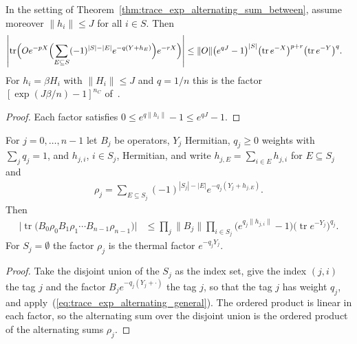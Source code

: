 \begin{theorem}
    \label{thm:trace_exp_alternating_sum_between_pow}
    \leanok
    In the setting of Theorem~\ref{thm:trace_exp_alternating_sum_between},
    assume moreover $\|h_i\|\le J$ for all $i\in S$. Then
    \begin{align}
        \left|\operatorname{tr}\Bigl(Oe^{-pX}\Bigl(\sum_{E\subseteq S}(-1)^{|S|-|E|}
        e^{-q(Y+h_E)}\Bigr)e^{-rX}\Bigr)\right|
         & \le \|O\|\bigl(e^{qJ}-1\bigr)^{|S|}
        \bigl(\operatorname{tr}e^{-X}\bigr)^{p+r}
        \bigl(\operatorname{tr}e^{-Y}\bigr)^{q}.
    \end{align}
    For $h_i=\beta H_i$ with $\|H_i\|\le J$ and $q=1/n$ this is the factor
    $[\exp(J\beta/n)-1]^{n_C}$ of~\cite{Hastings2006Solving}.
\end{theorem}
\begin{proof}\leanok
    Each factor satisfies $0\le e^{q\|h_i\|}-1\le e^{qJ}-1$.
\end{proof}

\begin{theorem}
    \label{thm:trace_exp_alternating_sum_product}
    \leanok
    For $j=0,\dots,n-1$ let $B_j$ be operators, $Y_j$ Hermitian, $q_j\ge0$
    weights with $\sum_jq_j=1$, and $h_{j,i}$, $i\in S_j$, Hermitian, and
    write $h_{j,E}=\sum_{i\in E}h_{j,i}$ for $E\subseteq S_j$ and
    \begin{align*}
        \rho_j=\sum_{E\subseteq S_j}(-1)^{|S_j|-|E|}e^{-q_j(Y_j+h_{j,E})}.
    \end{align*}
    Then
    \begin{align}
        \bigl|\operatorname{tr}\bigl(B_0\rho_0B_1\rho_1\cdots B_{n-1}\rho_{n-1}\bigr)\bigr|
         & \le\prod_j\|B_j\|\prod_{i\in S_j}\bigl(e^{q_j\|h_{j,i}\|}-1\bigr)
        \bigl(\operatorname{tr}e^{-Y_j}\bigr)^{q_j}.
        \label{eq:trace_exp_alternating_sum_product}
    \end{align}
    For $S_j=\emptyset$ the factor $\rho_j$ is the thermal factor
    $e^{-q_jY_j}$.
\end{theorem}
\begin{proof}\leanok
    Take the disjoint union of the $S_j$ as the index set, give the index
    $(j,i)$ the tag $j$ and the factor $B_je^{-q_j(Y_j+\cdot)}$ the tag $j$,
    so that the tag $j$ has weight $q_j$, and
    apply~(\ref{eq:trace_exp_alternating_general}). The ordered product is
    linear in each factor, so the alternating sum over the disjoint union is
    the ordered product of the alternating sums $\rho_j$.
\end{proof}

